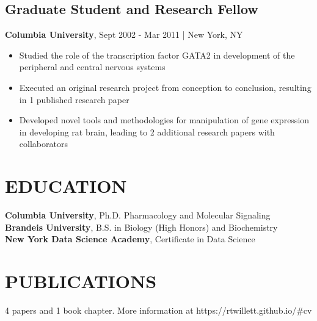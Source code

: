 \documentclass[11pt]{article}
\newenvironment{myitemize}
{ \begin{itemize}
	\setlength{\itemsep}{0pt}
	\setlength{\parskip}{0pt}
	\setlength{\parsep}{0pt}     }
{ \end{itemize}                  }
\begin{document}
\subsection*{Graduate Student and Research Fellow}
{\bfseries Columbia University}, Sept 2002 - Mar 2011 | New York, NY
\begin{myitemize}
	\item Studied the role of the transcription factor GATA2 in development of the peripheral and central nervous systems
	\item Executed an original research project from conception to conclusion, resulting in 1 published research paper 
	\item Developed novel tools and methodologies for manipulation of gene expression in developing rat brain, leading to 2 additional research papers with collaborators
\end{myitemize}

\section*{EDUCATION}
{\bfseries Columbia University}, Ph.D. Pharmacology and Molecular Signaling \\
{\bfseries Brandeis University}, B.S. in Biology (High Honors) and Biochemistry \\
{\bfseries New York Data Science Academy}, Certificate in Data Science

\section*{PUBLICATIONS}
4 papers and 1 book chapter. More information at https://rtwillett.github.io/\#cv
\end{document}
